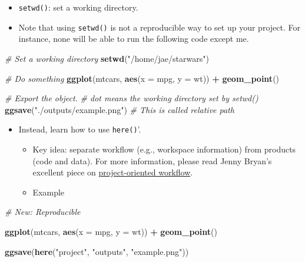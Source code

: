 \documentclass[
]{book}
\newenvironment{Shaded}{\begin{snugshade}}{\end{snugshade}}
\newcommand{\CommentTok}[1]{\textcolor[rgb]{0.56,0.35,0.01}{\textit{#1}}}
\newcommand{\DataTypeTok}[1]{\textcolor[rgb]{0.13,0.29,0.53}{#1}}
\newcommand{\KeywordTok}[1]{\textcolor[rgb]{0.13,0.29,0.53}{\textbf{#1}}}
\newcommand{\NormalTok}[1]{#1}
\newcommand{\OperatorTok}[1]{\textcolor[rgb]{0.81,0.36,0.00}{\textbf{#1}}}
\newcommand{\StringTok}[1]{\textcolor[rgb]{0.31,0.60,0.02}{#1}}
\begin{document}
\begin{itemize}
\item
  \texttt{setwd()}: set a working directory.
\item
  Note that using \texttt{setwd()} is not a reproducible way to set up your project. For instance, none will be able to run the following code except me.
\end{itemize}

\begin{Shaded}
\begin{Highlighting}[]
\CommentTok{\# Set a working directory }
\KeywordTok{setwd}\NormalTok{(}\StringTok{"/home/jae/starwars"}\NormalTok{)}

\CommentTok{\# Do something }
\KeywordTok{ggplot}\NormalTok{(mtcars, }\KeywordTok{aes}\NormalTok{(}\DataTypeTok{x =}\NormalTok{ mpg, }\DataTypeTok{y =}\NormalTok{ wt)) }\OperatorTok{+}
\StringTok{   }\KeywordTok{geom\_point}\NormalTok{()}

\CommentTok{\# Export the object. }
\CommentTok{\# dot means the working directory set by setwd()}
\KeywordTok{ggsave}\NormalTok{(}\StringTok{"./outputs/example.png"}\NormalTok{) }\CommentTok{\# This is called relative path }
\end{Highlighting}
\end{Shaded}

\begin{itemize}
\item
  Instead, learn how to use \texttt{here()}'.

  \begin{itemize}
  \item
    Key idea: separate workflow (e.g., workspace information) from products (code and data). For more information, please read Jenny Bryan's excellent piece on \href{https://www.tidyverse.org/blog/2017/12/workflow-vs-script/}{project-oriented workflow}.
  \item
    Example
  \end{itemize}
\end{itemize}

\begin{Shaded}
\begin{Highlighting}[]
\CommentTok{\# New: Reproducible }

\KeywordTok{ggplot}\NormalTok{(mtcars, }\KeywordTok{aes}\NormalTok{(}\DataTypeTok{x =}\NormalTok{ mpg, }\DataTypeTok{y =}\NormalTok{ wt)) }\OperatorTok{+}
\StringTok{   }\KeywordTok{geom\_point}\NormalTok{()}

\KeywordTok{ggsave}\NormalTok{(}\KeywordTok{here}\NormalTok{(}\StringTok{"project"}\NormalTok{, }\StringTok{"outputs"}\NormalTok{, }\StringTok{"example.png"}\NormalTok{))}
\end{Highlighting}
\end{Shaded}
\end{document}
